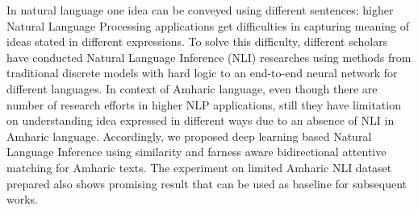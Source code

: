 In natural language one idea can be conveyed using different sentences; higher Natural Language Processing applications get difficulties in capturing meaning of ideas stated in different expressions. To solve this difficulty, different scholars have conducted Natural Language Inference (NLI) researches using methods from traditional discrete models with hard logic to an end-to-end neural network for different languages. In context of Amharic language, even though there are number of research efforts in higher NLP applications, still they have limitation on understanding idea expressed in different ways due to an absence of NLI in Amharic language. Accordingly, we proposed deep learning based Natural Language Inference using similarity and farness aware bidirectional attentive matching for Amharic texts. The experiment on limited Amharic NLI dataset prepared also shows promising result that can be used as baseline for subsequent works.
